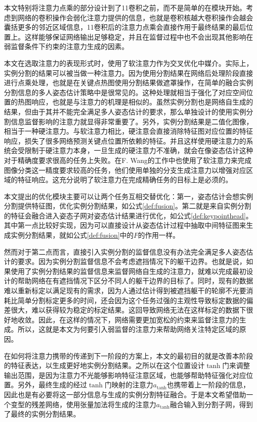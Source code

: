 本文特别将注意力点乘的部分设计到了1\times1卷积之前，而不是简单的在模块开始。考虑到网络的卷积操作会弱化注意力提供的信息，也就是卷积核越大卷积操作会越会囊括更多的邻近区域信息，1\times1卷积后的注意力点乘会直接作用于最终结果的最后位置上。这样能够保证网络输出足够稳定，并且在监督过程中也不会出现其他影响在弱监督条件下约束的注意力生成的因素。

本文在选取注意力的表现形式时，使用了软注意力作为交叉优化中媒介。实际上，实例分割的结果可以被当做一种注意力。因为使用分割结果在网络后处理阶段直接进行点乘处理，也就是在关键点热图使用分割结果做遮罩操作，在简单的融合实例分割信息的多人姿态估计策略中是很常见的。这种处理就相当于强化了对应空间位置的热图响应，也就是与注意力的机理是相似的。虽然实例分割也是网络自生成的结果，但由于其并不能完全满足多人姿态估计的要求，那么单独设计的使用实例分割信息监督影响的注意力就显得非常重要了。另外，实例分割结果是二值化图像，相当于一种硬注意力。与软注意力相比，硬注意会直接消除特征图对应位置的特征响应，损失了很多网络预测关键点位置所依赖的特征。并且这样使用硬注意力的系统会受限制于硬注意力本身，一旦生成的硬注意力不准确，就会在像姿态估计这种对于精确度要求很高的任务上失败。在F. Wang的工作\cite{wang2017residual}中也使用了软注意力来完成图像分类这一精度要求较高的任务，他们使用单独的分支生成注意力以增强对应区域的特征响应。这充分说明了软注意力在完成精确任务的目标上是必须的。

本文提出的优化模块主要可以让两个任务互相交替优化：第一，姿态估计会想实例分割提供特征图，优化实例分割结果，如公式\eqref{def:fusion}。第二就是来自实例分割的特征会融合进入姿态子网对姿态估计结果进行优化，如公式\eqref{def:keypointhead}。其中第一点比较好实现，因为可以直接设计从姿态估计过程中抽取中间特征图来生成实例分割结果，就如公式\eqref{def:fusion}中的$F$的作用一样。

然而对于第二点而言，直接引入实例分割的监督信息没有办法完全满足多人姿态估计的要求。因为实例分割监督信息不会考虑遮挡情况下的躯干边界。也就是说，如果使用了实例分割结果的监督信息来监督网络自生成的注意力，就难以完成最初设计的帮助网络在有遮挡情况下区分不同人的躯干边界的目标了。同时，现有的数据难以重新标定以满足现有的需求，因为人通过估计得到被遮挡躯干的轮廓不光要消耗比简单分割标定更多的时间，还会因为这个任务过强的主观性导致标定数据的偏差很大，难以获得较为稳定的标定结果。这回导致网络无法在这样标定的数据下很好地收敛。因此，在这样的情况下，网络需要更加宽松的约束来监督注意力的生成。所以，这就是本文为何要引入弱监督的注意力来帮助网络关注特定区域的原因。

在如何将注意力携带的传递到下一阶段的方案上，本文的最初目的就是改善本阶段的特征表达，以生成更好地实例分割结果。之所以在这个位置设计$\tanh$门来调整输出范围，是因为注意力不光能够影响特征注意区域，也能够帮助特征强化对应位置。另外，最终生成的经过$\tanh$门映射的注意力$a_{\tanh}$也携带着上一阶段的信息，因此也是有必要将这一部分信息与生成的实例分割特征融合。于是本文希望借助一个变型的残差网络，使用张量加法将生成的注意力$a_{\tanh}$融合输入到分割子网，得到了最终的实例分割结果。


